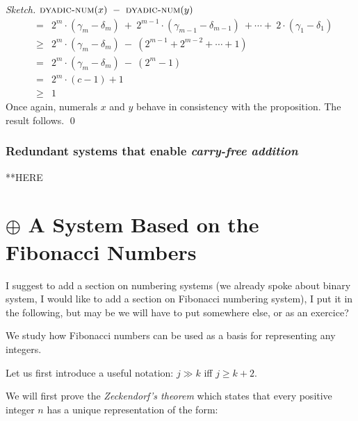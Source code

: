 \begin{proof}[Sketch]
\medskip

 $\mbox{\sc dyadic-num}(x) \ - \ \mbox{\sc dyadic-num}(y)$
\begin{eqnarray*}
  & =  &
2^m \cdot (\gamma_m - \delta_m) \ + \ 2^{m-1} \cdot (\gamma_{m-1} -
\delta_{m-1}) \ + \cdots + \  2 \cdot (\gamma_1 - \delta_1) \\
  & \geq &
2^m \cdot (\gamma_m - \delta_m) \ - \ \left( 2^{m-1} + 2^{m-2} +
\cdots + 1 \right) \\
  & = &
2^m \cdot (\gamma_m - \delta_m)\ - \ \left( 2^m -1 \right) \\
  & = &
2^m \cdot (c-1) +1 \\
  & \geq & 1
\end{eqnarray*}
Once again, numerals $x$ and $y$ behave in consistency with the
proposition.  The result follows.
\qed
\end{proof}



\subsubsection{Redundant systems that enable {\em carry-free addition}}
\label{sec:carry-free}

**HERE

\cite{Hwang79}

\section{$\oplus$ A System Based on the Fibonacci Numbers}
\label{sec:numerals-special-families}
\label{sec:Fibo-numbers}


{\Denis I suggest to add a section on numbering systems (we already spoke about binary system,
I would like to add a section on Fibonacci numbering system), 
I put it in the following, but may be we will have to put somewhere else, or as an exercice?}



We study how Fibonacci numbers can be used as a basis for representing any integers.

Let us first introduce a useful notation: $j \gg k$ iff $j \geq k+2$.

We will first prove the \textit{Zeckendorf's theorem} which states that every positive integer $n$ has a unique representation of the form:

